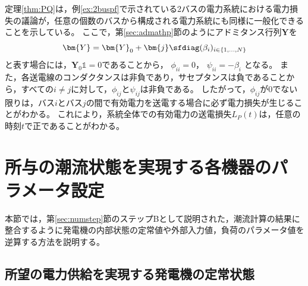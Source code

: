 \documentclass[tombow,dvipdfmx]{corona-a5-1.1}
\begin{document}
定理\ref{thm:PQ}は，例\ref{ex:2buspf}で示されている2バスの電力系統における電力損失の議論が，任意の個数のバスから構成される電力系統にも同様に一般化できることを示している。
ここで，第\ref{sec:admathp}節のようにアドミタンス行列$\bm{Y}$を
\[
\bm{Y}=\bm{Y}_0 + \bm{j} \sfdiag(\beta_i)_{i\in \{1,\ldots,N\} }
\]
と表す場合には，$\bm{Y}_0 \mathds{1}=0$であることから，
$\phi_{ii}=0$，
$\psi_{ii}= - \beta_i$
となる。
また，各送電線のコンダクタンスは非負であり，サセプタンスは負であることから，すべての$i\neq j$に対して，$\phi_{ij} $と$\psi_{ij}$は非負である。
したがって，$\phi_{ij}$が0でない限りは，バス$i$とバス$j$の間で有効電力を送電する場合に必ず電力損失が生じることがわかる。
これにより，系統全体での有効電力の送電損失$L_P(t)$は，任意の時刻$t$で正であることがわかる。

\section{所与の潮流状態を実現する各機器のパラメータ設定}\label{sec:paradef}

本節では，第\ref{sec:numstep}節のステップBとして説明された，潮流計算の結果に整合するように発電機の内部状態の定常値や外部入力値，負荷のパラメータ値を逆算する方法を説明する。


\subsection{所望の電力供給を実現する発電機の定常状態}\label{sec:stagen}
\end{document}
